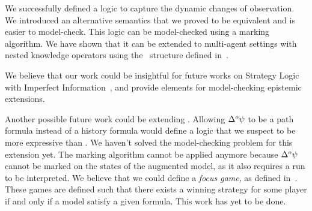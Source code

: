 We successfully defined a logic to capture the dynamic changes of observation. We introduced an alternative semantics that we proved to be equivalent and is easier to model-check. This logic can be model-checked using a marking algorithm. We have shown that it can be extended to multi-agent settings with nested knowledge operators using the \ktree\ structure defined in~\cite{DBLP:conf/fsttcs/MeydenS99}.

We believe that our work could be insightful for future works on Strategy Logic with Imperfect Information~\cite{DBLP:conf/lics/BerthonMMRV17}\cite{epistemicSL}, and provide elements for model-checking epistemic extensions.

Another possible future work could be extending \ctlskd. Allowing $\Delta^{o}\psi$ to be a path formula instead of a history formula would define a logic that we suspect to be more expressive than \ctlskd.
We haven't solved the model-checking problem for this extension yet. The marking algorithm cannot be applied anymore because $\Delta^{o}\psi$ cannot be marked on the states of the augmented model, as it also requires a run to be interpreted.
 We believe that we could define a \textit{focus game}, as defined in~\cite{DBLP:journals/logcom/LangeS02}. These games are defined such that there exists a winning strategy for some player if and only if a model satisfy a given formula. This work has yet to be done.
